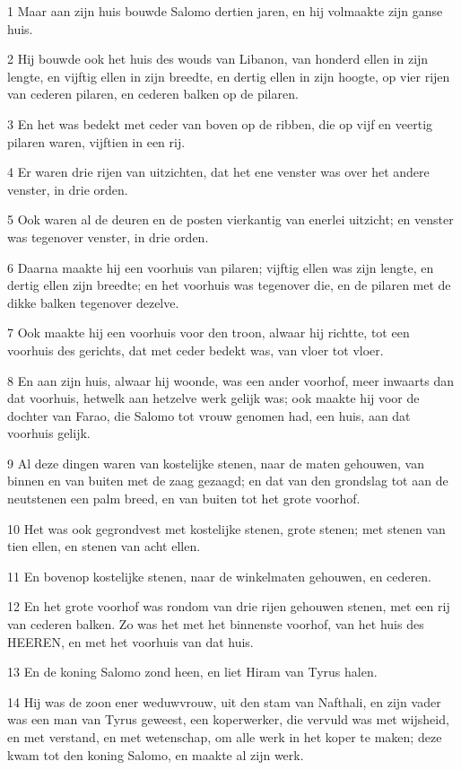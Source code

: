 \par 1 Maar aan zijn huis bouwde Salomo dertien jaren, en hij volmaakte zijn ganse huis.
\par 2 Hij bouwde ook het huis des wouds van Libanon, van honderd ellen in zijn lengte, en vijftig ellen in zijn breedte, en dertig ellen in zijn hoogte, op vier rijen van cederen pilaren, en cederen balken op de pilaren.
\par 3 En het was bedekt met ceder van boven op de ribben, die op vijf en veertig pilaren waren, vijftien in een rij.
\par 4 Er waren drie rijen van uitzichten, dat het ene venster was over het andere venster, in drie orden.
\par 5 Ook waren al de deuren en de posten vierkantig van enerlei uitzicht; en venster was tegenover venster, in drie orden.
\par 6 Daarna maakte hij een voorhuis van pilaren; vijftig ellen was zijn lengte, en dertig ellen zijn breedte; en het voorhuis was tegenover die, en de pilaren met de dikke balken tegenover dezelve.
\par 7 Ook maakte hij een voorhuis voor den troon, alwaar hij richtte, tot een voorhuis des gerichts, dat met ceder bedekt was, van vloer tot vloer.
\par 8 En aan zijn huis, alwaar hij woonde, was een ander voorhof, meer inwaarts dan dat voorhuis, hetwelk aan hetzelve werk gelijk was; ook maakte hij voor de dochter van Farao, die Salomo tot vrouw genomen had, een huis, aan dat voorhuis gelijk.
\par 9 Al deze dingen waren van kostelijke stenen, naar de maten gehouwen, van binnen en van buiten met de zaag gezaagd; en dat van den grondslag tot aan de neutstenen een palm breed, en van buiten tot het grote voorhof.
\par 10 Het was ook gegrondvest met kostelijke stenen, grote stenen; met stenen van tien ellen, en stenen van acht ellen.
\par 11 En bovenop kostelijke stenen, naar de winkelmaten gehouwen, en cederen.
\par 12 En het grote voorhof was rondom van drie rijen gehouwen stenen, met een rij van cederen balken. Zo was het met het binnenste voorhof, van het huis des HEEREN, en met het voorhuis van dat huis.
\par 13 En de koning Salomo zond heen, en liet Hiram van Tyrus halen.
\par 14 Hij was de zoon ener weduwvrouw, uit den stam van Nafthali, en zijn vader was een man van Tyrus geweest, een koperwerker, die vervuld was met wijsheid, en met verstand, en met wetenschap, om alle werk in het koper te maken; deze kwam tot den koning Salomo, en maakte al zijn werk.
